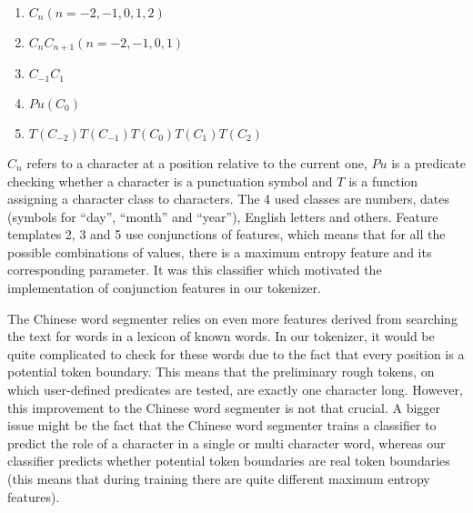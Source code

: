 \begin{enumerate}
  \item $C_n (n = -2,-1,0,1,2)$
  \item $C_n C_{n+1} (n = -2,-1,0,1)$
  \item $C_{-1} C_1$
  \item $Pu(C_0)$
  \item $T(C_{-2}) T(C_{-1}) T(C_0) T(C_1) T(C_2)$
\end{enumerate}

$C_n$ refers to a character at a position relative to the current one, $Pu$ is
a predicate checking whether a character is a punctuation symbol and $T$ is a
function assigning a character class to characters. The 4 used classes are
numbers, dates (symbols for ``day'', ``month'' and ``year''), English letters
and others. Feature templates 2, 3 and 5 use conjunctions of features, which
means that for all the possible combinations of values, there is a maximum
entropy feature and its corresponding parameter. It was this classifier which
motivated the implementation of conjunction features in our tokenizer.

The Chinese word segmenter relies on even more features derived from searching
the text for words in a lexicon of known words. In our tokenizer, it would be
quite complicated to check for these words due to the fact that every position
is a potential token boundary. This means that the preliminary rough tokens, on
which user-defined predicates are tested, are exactly one character long.
However, this improvement to the Chinese word segmenter is not that crucial. A
bigger issue might be the fact that the Chinese word segmenter trains a
classifier to predict the role of a character in a single or multi character
word, whereas our classifier predicts whether potential token boundaries are
real token boundaries (this means that during training there are quite
different maximum entropy features).
